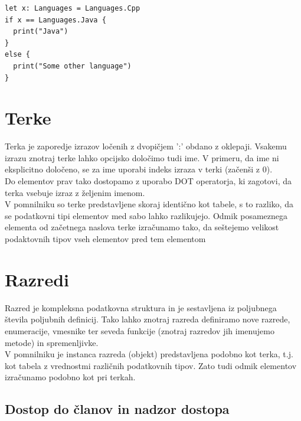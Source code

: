 \documentclass[a4paper, 12pt]{book}
\begin{document}
\begin{lstlisting}[caption={Izvajanje logike na podlagi vrednosti enumeracije \ref{lst:languagesEnumeration}}, captionpos=b]
let x: Languages = Languages.Cpp
if x == Languages.Java {
  print("Java")
}
else {
  print("Some other language")
}
\end{lstlisting}

\section{Terke}

Terka je zaporedje izrazov ločenih z dvopičjem ':' obdano z oklepaji. Vsakemu izrazu znotraj terke lahko opcijsko določimo tudi ime. V primeru, da ime ni eksplicitno določeno, se za ime uporabi indeks izraza v terki (začenši z 0). \\
\indent Do elementov prav tako dostopamo z uporabo DOT operatorja, ki zagotovi, da terka vsebuje izraz z željenim imenom.\\
\indent V pomnilniku so terke predstavljene skoraj identično kot tabele, s to razliko, da se podatkovni tipi elementov med sabo lahko razlikujejo. Odmik posameznega elementa od začetnega naslova terke izračunamo tako, da seštejemo velikost podaktovnih tipov vseh elementov pred tem elementom


\section{Razredi}

Razred je kompleksna podatkovna struktura in je sestavljena iz poljubnega števila poljubnih definicij. Tako lahko znotraj razreda definiramo nove razrede, enumeracije, vmesnike ter seveda funkcije (znotraj razredov jih imenujemo metode) in spremenljivke. \\
\indent V pomnilniku je instanca razreda (objekt) predstavljena podobno kot terka, t.j. kot tabela z vrednostmi različnih podatkovnih tipov. Zato tudi odmik elementov izračunamo podobno kot pri terkah.

\subsection{Dostop do članov in nadzor dostopa}
\end{document}
